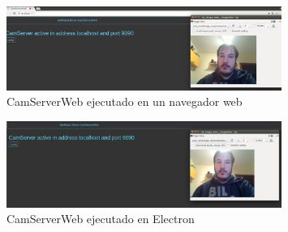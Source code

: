 \begin{figure}[H]
  \begin{center}
    \includegraphics[width=0.8\textwidth]{figures/camservernodejs.png}
    		\caption{CamServerWeb ejecutado en un navegador web}
		\label{fig.testcamserver1}
		\end{center}
\end{figure}
\begin{figure}[H]
  \begin{center}
    \includegraphics[width=0.8\textwidth]{figures/camserverelectron.png}
    		\caption{CamServerWeb ejecutado en Electron}
		\label{fig.testcamserver2}
		\end{center}
\end{figure}
